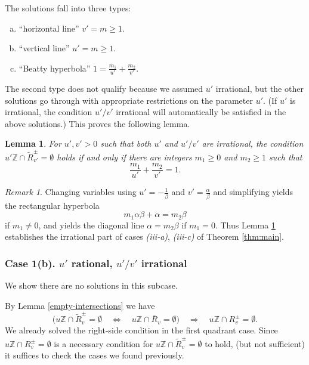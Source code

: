 \documentclass[12pt,letterpaper, reqno]{amsart}
\newtheorem{lem}[thm]{Lemma}
\theoremstyle{definition}
\theoremstyle{remark}
\newtheorem{rmk}[thm]{Remark}
\newcommand{\ZZ}{\ensuremath{\mathbb{Z}}}
\newcommand{\uu}{{u'}}
\newcommand{\vv}{{v'}}
\begin{document}
The solutions fall into three types: 
\begin{enumerate}[(a)]
\item {``horizontal line'' $\vv = m\geq 1$}. 

\item {``vertical line'' $\uu = m\geq 1$}.
\item {``Beatty hyperbola'' $1 = \frac{m_1}{\uu} + \frac{m_2}{\vv}$}. 

\end{enumerate}

The second type does not qualify because we assumed $\uu$ irrational, but the other solutions go through with appropriate restrictions on the parameter $\uu$. (If $\uu$ is irrational, the condition $\uu/\vv$ irrational will automatically be satisfied in the above solutions.) This proves the following lemma.

\begin{lem}\label{lem:54}
For $\uu,\vv>0$ such that both $\uu$ and $\uu/\vv$ are irrational, the condition $\uu\ZZ\cap \widetilde{R}^\pm_\vv = \emptyset$ holds if and only if there are integers $m_1\geq 0$ and $m_2 \geq 1$ such that
\begin{equation}\label{uv-frac} 
\frac{m_1}{\uu} + \frac{m_2}{\vv} = 1 .\end{equation}
\end{lem}
\begin{rmk} 
Changing variables using $\uu= -\frac{1}{\beta}$ and $\vv= \frac{\alpha}{\beta}$
and simplifying yields the rectangular hyperbola 
$$m_1 \alpha \beta  +\alpha= m_2 \beta$$
if $m_1\neq 0$, and yields the diagonal line
$ \alpha = m_2 \beta $
if $m_1=0$.
Thus Lemma \ref{lem:54} establishes the irrational part of
 cases {\it (iii-a)}, {\it (iii-c)} of Theorem \ref{thm:main}.
\end{rmk}

\subsubsection{Case 1(b). $\uu$ rational, $\uu/\vv$ irrational} 
We show there  are no solutions in this subcase.

By Lemma \ref{empty-intersections} we have
\[ \big( u\ZZ\cap \widetilde{R}_{v}^\pm =\emptyset \quad\Leftrightarrow\quad u\ZZ\cap \bar{R}_v = \emptyset \big) \quad\Rightarrow\quad  u\ZZ\cap R_v^\pm=\emptyset.\]
We already solved the right-side condition in the first quadrant case. Since $u\ZZ\cap R_v^\pm=\emptyset$ is a necessary condition for $u\ZZ\cap \widetilde{R}_{v}^\pm =\emptyset$ to hold, (but not sufficient) it suffices to check the cases we found previously.
\end{document}
